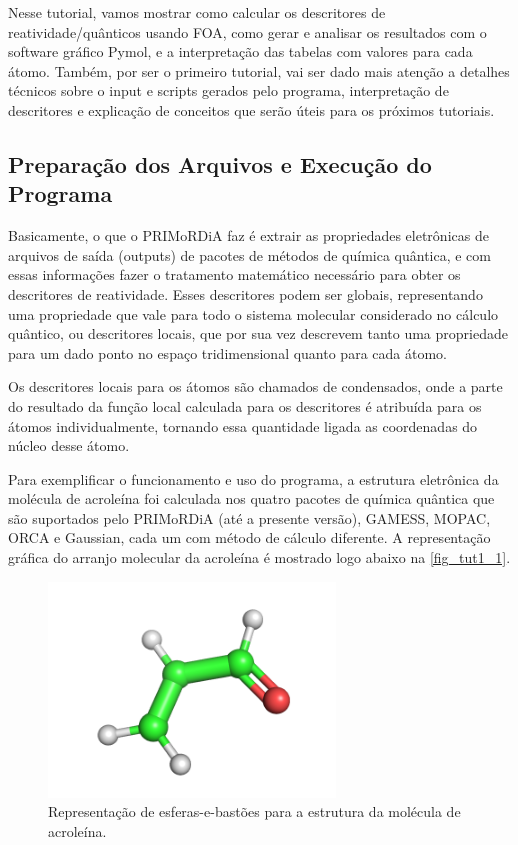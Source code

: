 \documentclass[a4paper,11pt]{refart}
\begin{document}
Nesse tutorial, vamos mostrar como calcular os descritores de reatividade/quânticos usando FOA, como gerar e analisar os resultados com o software gráfico Pymol, e a interpretação das tabelas com valores para cada átomo. Também, por ser o primeiro tutorial, vai ser dado mais atenção a detalhes técnicos sobre o input e scripts gerados pelo programa, interpretação de descritores e explicação de conceitos que serão úteis para os próximos tutoriais.

\subsection{Preparação dos Arquivos e Execução do Programa}

Basicamente, o que o PRIMoRDiA faz é extrair as propriedades eletrônicas de arquivos de saída (outputs) de pacotes de métodos de química quântica, e com essas informações fazer o tratamento matemático necessário para obter os descritores de reatividade. Esses descritores podem ser globais, representando uma propriedade que vale para todo o sistema molecular considerado no cálculo quântico, ou descritores locais, que por sua vez descrevem tanto uma propriedade para um dado ponto no espaço tridimensional quanto para cada átomo. 

Os descritores locais para os átomos são chamados de condensados, onde a parte do resultado da função local calculada para os descritores é atribuída para os átomos individualmente, tornando essa quantidade ligada as coordenadas do núcleo desse átomo.

Para exemplificar o funcionamento e uso do programa, a estrutura eletrônica da molécula de acroleína foi calculada nos quatro pacotes de química quântica que são suportados pelo PRIMoRDiA (até a presente versão), GAMESS, MOPAC, ORCA e Gaussian, cada um com método de cálculo diferente. A representação gráfica do arranjo molecular da acroleína é mostrado logo abaixo na \autoref{fig_tut1_1}.


\hspace*{-\leftmarginwidth}
\begin{minipage}{\fullwidth}
\begin{figure}[H]
\begin{center}
\includegraphics[width=3in]{images/img0}
\caption{Representação de esferas-e-bastões para a estrutura da molécula de acroleína.}
\label{fig_tut1_1}
\end{center}
\end{figure}
\end{minipage}	
\end{document}

